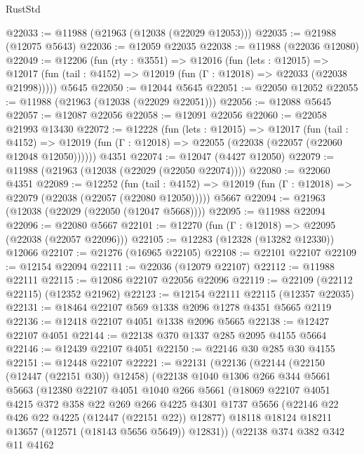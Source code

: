 \begin{lexlean}{RustStd}
\begin{coremodule}
@22033 := @11988 (@21963 (@12038 (@22029 @12053)))
@22035 := @21988 (@12075 @5643)
@22036 := @12059 @22035
@22038 := @11988 (@22036 @12080)
@22049 := @12206
    (fun (rty : @3551) =>
    @12016
      (fun (lets : @12015) =>
      @12017 (fun (tail : @4152) => @12019 (fun (Γ : @12018) => @22033 (@22038 @21998)))))
    @5645
@22050 := @12044 @5645
@22051 := @22050 @12052
@22055 := @11988 (@21963 (@12038 (@22029 @22051)))
@22056 := @12088 @5645
@22057 := @12087 @22056
@22058 := @12091 @22056
@22060 := @22058 @21993 @13430
@22072 := @12228
    (fun (lets : @12015) =>
    @12017
      (fun (tail : @4152) =>
      @12019 (fun (Γ : @12018) => @22055 (@22038 (@22057 (@22060 @12048 @12050))))))
    @4351
@22074 := @12047 (@4427 @12050)
@22079 := @11988 (@21963 (@12038 (@22029 (@22050 @22074))))
@22080 := @22060 @4351
@22089 := @12252
    (fun (tail : @4152) => @12019 (fun (Γ : @12018) => @22079 (@22038 (@22057 (@22080 @12050)))))
    @5667
@22094 := @21963 (@12038 (@22029 (@22050 (@12047 @5668))))
@22095 := @11988 @22094
@22096 := @22080 @5667
@22101 := @12270 (fun (Γ : @12018) => @22095 (@22038 (@22057 @22096)))
@22105 := @12283 (@12328 (@13282 @12330)) @12066
@22107 := @21276 (@16965 @22105)
@22108 := @22101 @22107
@22109 := @12154 @22094
@22111 := @22036 (@12079 @22107)
@22112 := @11988 @22111
@22115 := @12086 @22107 @22056 @22096
@22119 := @22109 (@22112 @22115) (@12352 @21962)
@22123 := @12154 @22111 @22115 (@12357 @22035)
@22131 := @18464 @22107 @569 @1338 @2096 @1278 @4351 @5665 @2119
@22136 := @12418 @22107 @4051 @1338 @2096 @5665
@22138 := @12427 @22107 @4051
@22144 := @22138 @370 @1337 @285 @2095 @4155 @5664
@22146 := @12439 @22107 @4051
@22150 := @22146 @30 @285 @30 @4155
@22151 := @12448 @22107
@22221 := @22131
    (@22136
      (@22144
        (@22150 (@12447 (@22151 @30)) @12458)
        (@22138
          @1040
          @1306
          @266
          @344
          @5661
          @5663
          (@12380
            @22107
            @4051
            @1040
            @266
            @5661
            (@18069
              @22107
              @4051
              @4215
              @372
              @358
              @22
              @269
              @266
              @4225
              @4301
              @1737
              @5656
              (@22146 @22 @426 @22 @4225 (@12447 (@22151 @22)) @12877)
              @18118
              @18124
              @18211
              @13657
              (@12571 (@18143 @5656 @5649))
              @12831))
          (@22138
            @374
            @382
            @342
            @11
            @4162

\end{coremodule}
\end{lexlean}
